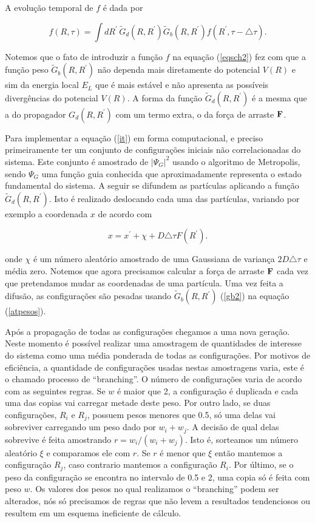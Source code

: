 \documentclass[12pt,twoside,a4paper]{report}
\begin{document}
\noindent A evolução temporal de $f$ é dada por

\begin{equation} \label{it}
f(R,\tau) = \int dR^{'} \,
\tilde{G}_d(R,R^{'})\tilde{G}_b(R,R^{'}) f(R^{'},
\tau-\triangle \tau).
\end{equation}

Notemos que o fato de introduzir a função $f$ na equação
(\ref{eqsch2}) fez com que a
função peso $\tilde{G}_b(R,R^{'})$ não dependa mais diretamente
do potencial $V(R)$ e sim da energia local $E_L$ que é mais
estável e não apresenta as possíveis divergências do potencial $V(R)$. A 
forma da função
$\tilde{G}_d(R,R^{'})$ é a mesma que a
do propagador $G_d(R,R^{'})$ com um termo extra,
o da força de arraste ${\bf F}$.

Para implementar a equação (\ref{it}) em forma computacional, e
preciso primeiramente
ter um conjunto de configurações iniciais não correlacionadas do sistema. 
Este
conjunto é amostrado de $|\Psi_G|^2$ usando o algoritmo de Metropolis, sendo 
$\Psi_G$ uma função
guia conhecida que aproximadamente representa o
estado
fundamental do sistema. A seguir se
difundem as partículas aplicando a função $\tilde{G}_d(R,R^{'})$.
Isto é realizado deslocando cada uma das partículas, variando por exemplo a
coordenada $x$ de acordo com

\begin{equation} \label{desl}
x = x^{'} + \chi + D \triangle \tau F(R^{'}).
\end{equation}

\noindent onde $\chi$ é um número aleatório amostrado de uma
Gaussiana de variança $2D\triangle\tau$ e média zero. Notemos que agora 
precisamos calcular a
força de
arraste ${\bf F}$ cada
vez que pretendamos mudar as coordenadas de uma partícula. Uma vez
feita a difusão, as
configurações são pesadas usando $\tilde{G}_b(R,R^{'})$ (\ref{gb2}) na 
equação (\ref{atpesos}).

Após a propagação de todas as configurações chegamos a uma nova
geração. Neste momento é possível realizar uma
amostragem de quantidades de interesse do sistema como
uma média ponderada de todas as configurações. Por motivos de
eficiência, a quantidade
de configurações usadas nestas amostragens varia, este
é o chamado processo
de ``branching''. O número de configurações varia de acordo com as
seguintes regras. Se $w$ é maior que 2, a configuração é duplicada e cada uma das
copias vai
carregar metade deste peso. Por outro lado, se duas configurações, $R_i$ e 
$R_j$,
possuem pesos menores
que 0.5, só uma delas vai sobreviver carregando um peso dado por
$w_i+w_j$. A decisão de
qual delas sobrevive é feita amostrando $r=w_i/(w_i+w_j)$. Isto
é, sorteamos um
número aleatório $\xi$ e comparamos ele com $r$. Se $r$ é menor
que $\xi$ então
mantemos a configuração $R_j$, caso contrario mantemos a
configuração $R_i$. Por
último, se o peso da configuração se encontra no intervalo de 0.5 e
2, uma copia só é feita com peso $w$. Os valores dos pesos no qual realizamos o
``branching'' podem ser
alterados, nós só precisamos de regras que não levem a resultados 
tendenciosos
ou resultem em um
esquema ineficiente de cálculo.
\end{document}
